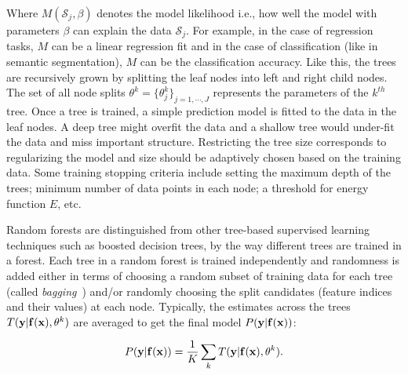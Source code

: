 Where $M(\mathcal{S}_j,\beta)$ denotes the model likelihood i.e., how well the model with parameters
$\beta$ can explain the data $\mathcal{S}_j$.
For example, in the case of regression tasks, $M$ can be a linear regression fit
and in the case of classification
(like in semantic segmentation), $M$ can be the classification accuracy.
Like this, the trees are recursively grown by splitting the leaf nodes into left and right
child nodes. The set of all node splits $\theta^k=\{\theta^k_j\}_{j=1,\cdots,J}$ represents
the parameters of the $k^{th}$ tree.
Once a tree is trained, a simple prediction
model is fitted to the data in the leaf nodes. A deep tree might overfit the data
and a shallow tree would under-fit the data and miss important structure. Restricting
the tree size corresponds to regularizing the model and size should be adaptively
chosen based on the training data. Some training stopping criteria include setting the
maximum depth of the trees; minimum number of data points in each node;
a threshold for energy function $E$, etc.

Random forests are distinguished from other tree-based
supervised learning techniques such as boosted decision trees, by the way different
trees are trained in a forest. Each tree in a random forest is trained independently
and randomness is added either in terms of choosing a random subset of training data for each
tree (called \textit{bagging}~\cite{breiman1996bagging}) and/or randomly
choosing the split candidates (feature indices and their values) at each node.
Typically, the estimates across the trees $T(\mathbf{y}|\mathbf{f}(\mathbf{x}),\mathbf{\theta}^k)$
are averaged to get the final model $P(\mathbf{y}|\mathbf{f}(\mathbf{x}))$:

\begin{equation}
P(\mathbf{y}|\mathbf{f}(\mathbf{x})) = \frac{1}{K}\sum_{k} T(\mathbf{y}|\mathbf{f}(\mathbf{x}),\mathbf{\theta}^k).
\end{equation}

